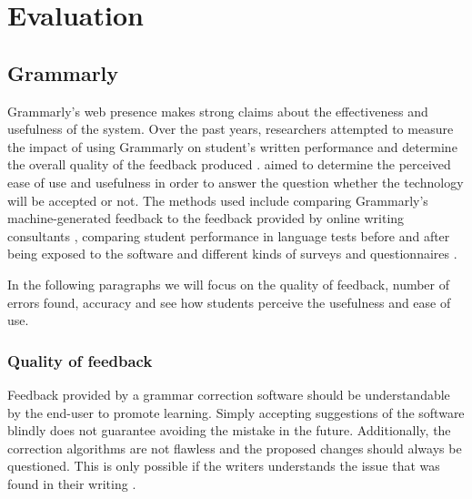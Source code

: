 \documentclass[runningheads]{llncs}
\let\OldTextregistered\textregistered
\renewcommand{\textregistered}{\OldTextregistered\xspace}
\begin{document}
\section{Evaluation}

\subsection{Grammarly\textregistered}
Grammarly\textregistered's web presence \citep{noauthor_grammarly_nodate} makes strong claims about the effectiveness and usefulness of the system. Over the past years, researchers attempted to measure the impact of using Grammarly\textregistered on student's written performance and determine the overall quality of the feedback produced \citep{dembsey_closing_2017,nova_utilizing_2018,ventayen_graduate_2018}. \textcite{cavaleri_you_2016} aimed to determine the perceived ease of use and usefulness in order to answer the question whether the technology will be accepted or not. The methods used include comparing Grammarly\textregistered's machine-generated feedback to the feedback provided by online writing consultants \citep{dembsey_closing_2017}, comparing student performance in language tests before and after being exposed to the software \citep{qassemzadeh_impact_2016} and different kinds of surveys and questionnaires \citep{nova_utilizing_2018, cavaleri_you_2016, ventayen_graduate_2018}.

In the following paragraphs we will focus on the quality of feedback, number of errors found, accuracy and see how students perceive the usefulness and ease of use.

\subsubsection{Quality of feedback}
Feedback provided by a grammar correction software should be understandable by the end-user to promote learning. Simply accepting suggestions of the software blindly does not guarantee avoiding the mistake in the future. Additionally, the correction algorithms are not flawless and the proposed changes should always be questioned. This is only possible if the writers understands the issue that was found in their writing \citep{dembsey_closing_2017}.
\end{document}
